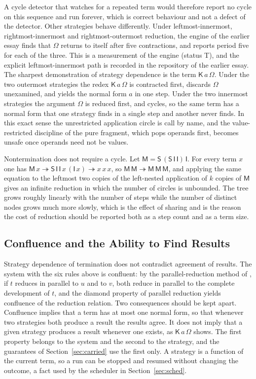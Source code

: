 \documentclass[11pt]{article}
\theoremstyle{definition}
\theoremstyle{remark}
\newcommand{\cI}{\mathsf{I}}
\newcommand{\cK}{\mathsf{K}}
\newcommand{\cS}{\mathsf{S}}
\newcommand{\cM}{\mathsf{M}}
\newcommand{\red}{\twoheadrightarrow}
\newcommand{\Tt}{status T}
\begin{document}
A cycle detector that watches for a repeated term would therefore report no cycle on this sequence and run forever, which is correct behaviour and not a defect of the detector. Other strategies behave differently. Under leftmost-innermost, rightmost-innermost and rightmost-outermost reduction, the engine of the earlier essay finds that $\Omega$ returns to itself after five contractions, and reports period five for each of the three. This is a measurement of the engine (\Tt), and the explicit leftmost-innermost path is recorded in the repository of the earlier essay. The sharpest demonstration of strategy dependence is the term $\cK\,a\,\Omega$. Under the two outermost strategies the redex $\cK\,a\,\Omega$ is contracted first, discards $\Omega$ unexamined, and yields the normal form $a$ in one step. Under the two innermost strategies the argument $\Omega$ is reduced first, and cycles, so the same term has a normal form that one strategy finds in a single step and another never finds. In this exact sense the unrestricted application circle is call by name, and the value-restricted discipline of the pure fragment, which pops operands first, becomes unsafe once operands need not be values.

Nontermination does not require a cycle. Let $\cM=\cS\,(\cS\,\cI\,\cI)\,\cI$. For every term $x$ one has $\cM\,x\red\cS\,\cI\,\cI\,x\,(\cI\,x)\red x\,x\,x$, so $\cM\,\cM\red\cM\,\cM\,\cM$, and applying the same equation to the leftmost two copies of the left-nested application of $k$ copies of $\cM$ gives an infinite reduction in which the number of circles is unbounded. The tree grows roughly linearly with the number of steps while the number of distinct nodes grows much more slowly, which is the effect of sharing and is the reason the cost of reduction should be reported both as a step count and as a term size.

\subsection{Confluence and the Ability to Find Results}

Strategy dependence of termination does not contradict agreement of results. The system with the six rules above is confluent: by the parallel-reduction method of \citet{takahashi1995}, if $t$ reduces in parallel to $u$ and to $v$, both reduce in parallel to the complete development of $t$, and the diamond property of parallel reduction yields confluence of the reduction relation. Two consequences should be kept apart. Confluence implies that a term has at most one normal form, so that whenever two strategies both produce a result the results agree. It does not imply that a given strategy produces a result whenever one exists, as $\cK\,a\,\Omega$ shows. The first property belongs to the system and the second to the strategy, and the guarantees of Section~\ref{sec:carried} use the first only. A strategy is a function of the current term, so a run can be stopped and resumed without changing the outcome, a fact used by the scheduler in Section~\ref{sec:sched}.
\end{document}
